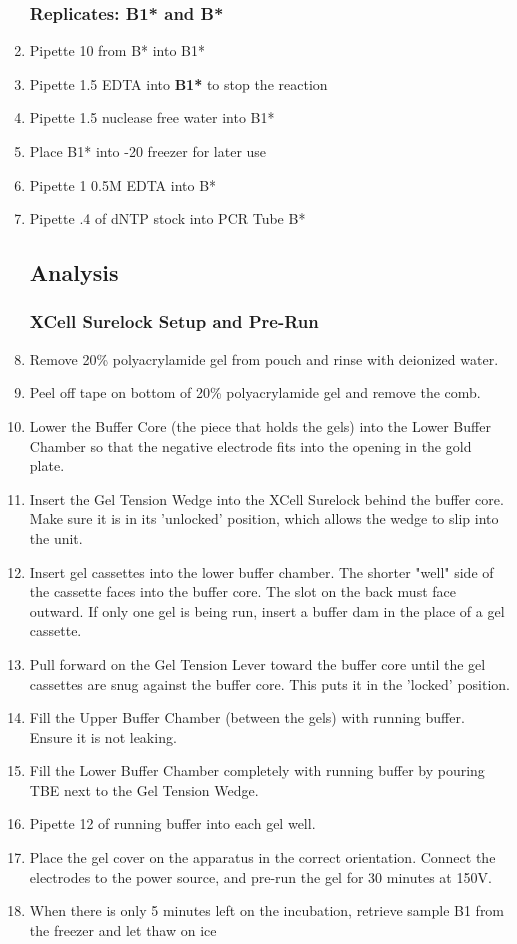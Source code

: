 \documentclass{ssiBio}
\begin{document}
\begin{enumerate}
\subsubsection{Replicates: B1* and B*}
\item{Pipette 10\uL{} from B* into B1*\label{2B1}}
\item{Pipette 1.5\uL{} EDTA into \textbf{B1*} to stop the reaction \cite{Invitrogen2002}\label{2B2}}
\item{Pipette 1.5\uL{} nuclease free water into B1*\label{2B3}}
\item{Place B1* into -20\C{} freezer for later use\label{2B4}}
\item{Pipette 1\uL{} 0.5M EDTA into B*\label{2B5}}
\item{Pipette .4\uL{} of dNTP stock into PCR Tube B*\label{2B6}}

\RstopPoint{} 
\subsection{Analysis}
\subsubsection{XCell Surelock Setup and Pre-Run}
\item{Remove 20\% polyacrylamide gel from pouch and rinse with deionized water.}
\item{Peel off tape on bottom of 20\% polyacrylamide gel and remove the comb.}
\item{Lower the Buffer Core (the piece that holds the gels) into the Lower Buffer Chamber so that the negative electrode fits into the opening in the gold plate.}
\item{Insert the Gel Tension Wedge into the XCell Surelock behind the buffer core. Make sure it is in its 'unlocked' position, which allows the wedge to slip into the unit.}
\item{Insert gel cassettes into the lower buffer chamber. The shorter "well" side of the cassette faces into the buffer core. The slot on the back must face outward. If only one gel is being run, insert a buffer dam in the place of a gel cassette.}
\item{Pull forward on the Gel Tension Lever toward the buffer core until the gel cassettes are snug against the buffer core. This puts it in the 'locked' position.}
\item{Fill the Upper Buffer Chamber (between the gels) with running buffer. Ensure it is not leaking.}
\item{Fill the Lower Buffer Chamber completely with running buffer by pouring TBE next to the Gel Tension Wedge.}
\item{Pipette 12\uL{} of running buffer into each gel well.}
\item{Place the gel cover on the apparatus in the correct orientation. Connect the electrodes to the power source, and pre-run the gel for 30 minutes at 150V.}
\item{When there is only 5 minutes left on the incubation, retrieve sample B1 from the freezer and let thaw on ice}

\end{enumerate}
\end{document}

